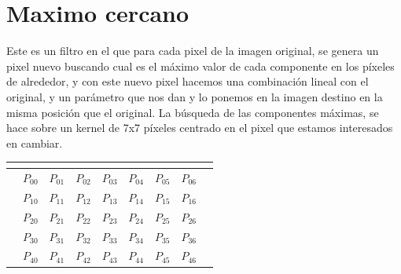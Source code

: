 \section{Maximo cercano}

Este es un filtro en el que para cada pixel de la imagen original, se genera un pixel nuevo buscando cual es el máximo valor de cada componente en los píxeles de alrededor, y con este nuevo pixel hacemos una combinación lineal con el original, y un parámetro que nos dan y lo ponemos en la imagen destino en la misma posición que el original. La búsqueda de las componentes máximas, se hace sobre un kernel de 7x7 píxeles centrado en el pixel que estamos interesados en cambiar.

\begin{table}[h]
\centering
\begin{tabular}{l|c|c|c|c|c|c|c|l}
 & \multicolumn{1}{l|}{}       & \multicolumn{1}{l|}{}      & \multicolumn{1}{l|}{}       & \multicolumn{1}{l|}{}       & \multicolumn{1}{l|}{}       & \multicolumn{1}{l|}{}       & \multicolumn{1}{l|}{}      &  \\ \hline
 & \cellcolor[HTML]{FAFE8E}$P_{00}$ & \cellcolor[HTML]{FAFE8E}$P_{01}$  & \cellcolor[HTML]{FAFE8E}$P_{02}$  & \cellcolor[HTML]{FAFE8E}$P_{03}$  & \cellcolor[HTML]{FAFE8E}$P_{04}$  & \cellcolor[HTML]{FAFE8E}$P_{05}$ & \cellcolor[HTML]{FAFE8E}$P_{06}$ &  \\ \hline
 & \cellcolor[HTML]{FAFE8E}$P_{10}$ & \cellcolor[HTML]{FAFE8E}$P_{11}$  & \cellcolor[HTML]{FAFE8E}$P_{12}$  & \cellcolor[HTML]{FAFE8E}$P_{13}$  & \cellcolor[HTML]{FAFE8E}$P_{14}$  & \cellcolor[HTML]{FAFE8E}$P_{15}$ & \cellcolor[HTML]{FAFE8E}$P_{16}$ &  \\ \hline
 & \cellcolor[HTML]{FAFE8E}$P_{20}$ & \cellcolor[HTML]{FAFE8E}$P_{21}$  & \cellcolor[HTML]{FAFE8E}$P_{22}$  & \cellcolor[HTML]{FAFE8E}$P_{23}$  & \cellcolor[HTML]{FAFE8E}$P_{24}$  & \cellcolor[HTML]{FAFE8E}$P_{25}$ & \cellcolor[HTML]{FAFE8E}$P_{26}$ &  \\ \hline
 & \cellcolor[HTML]{FAFE8E}$P_{30}$ & \cellcolor[HTML]{FAFE8E}$P_{31}$  & \cellcolor[HTML]{FAFE8E}$P_{32}$  & \cellcolor[HTML]{FE8E8E}$P_{33}$  & \cellcolor[HTML]{FAFE8E}$P_{34}$  & \cellcolor[HTML]{FAFE8E}$P_{35}$ & \cellcolor[HTML]{FAFE8E}$P_{36}$ &  \\ \hline
 & \cellcolor[HTML]{FAFE8E}$P_{40}$ & \cellcolor[HTML]{FAFE8E}$P_{41}$  & \cellcolor[HTML]{FAFE8E}$P_{42}$  & \cellcolor[HTML]{FAFE8E}$P_{43}$  & \cellcolor[HTML]{FAFE8E}$P_{44}$  & \cellcolor[HTML]{FAFE8E}$P_{45}$ & \cellcolor[HTML]{FAFE8E}$P_{46}$ &  \\ \hline

\end{tabular}
\end{table}
